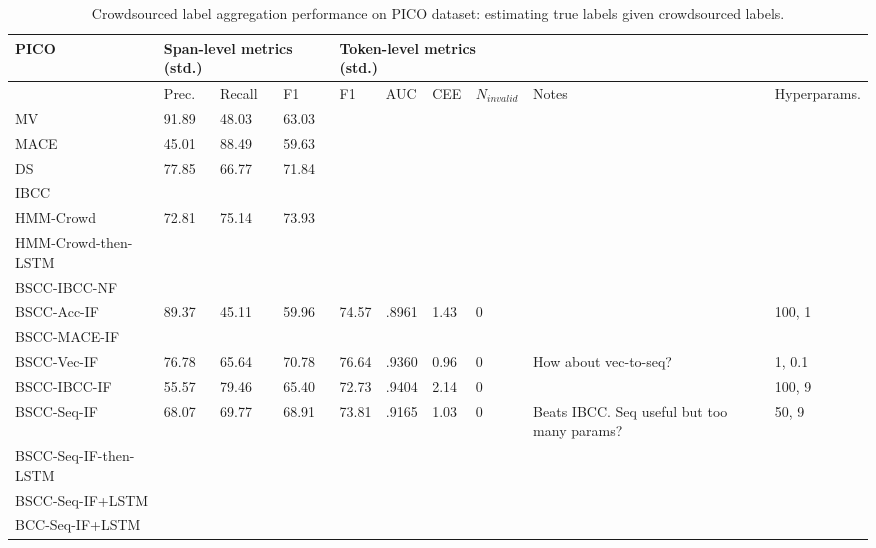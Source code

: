\begin{table}
\begin{tabularx}{\textwidth}{| l | X | X | X | X | X | X | X | X | X |}
\hline
PICO & \multicolumn{3}{|l|}{Span-level metrics (std.)}                          & \multicolumn{4}{|l|}{Token-level metrics (std.)} & &\\ \hline 
& Prec. & Recall & F1 & F1 & AUC & CEE & $N_{invalid}$ & Notes & Hyperparams. \\ \hline
MV & 91.89 & 48.03 & 63.03 & \\
MACE & 45.01 & 88.49 & 59.63 &\\
DS & 77.85 & 66.77 & 71.84 &\\ 
IBCC & \\ \hline
HMM-Crowd & 72.81 & 75.14 & 73.93 &\\ 
HMM-Crowd-then-LSTM &\\ \hline
BSCC-IBCC-NF & \\ \hline
BSCC-Acc-IF & 89.37 & 45.11 & 59.96 & 74.57 & .8961 & 1.43 & 0 & & 100, 1 \\
BSCC-MACE-IF & \\
BSCC-Vec-IF & 76.78 & 65.64 & 70.78 & 76.64 & .9360 & 0.96 & 0 & How about vec-to-seq? & 1, 0.1\\
BSCC-IBCC-IF & 55.57 & 79.46 & 65.40 & 72.73 & .9404 & 2.14 & 0 & & 100, 9 \\
BSCC-Seq-IF & 68.07 & 69.77 & 68.91 & 73.81 & .9165 & 1.03 & 0 & Beats IBCC. Seq useful but too many params? & 50, 9 \\ \hline
BSCC-Seq-IF-then-LSTM &\\
BSCC-Seq-IF+LSTM &\\
BCC-Seq-IF+LSTM &\\ %
\hline
\end{tabularx}
\caption{Crowdsourced label aggregation performance on PICO dataset: estimating true labels given crowdsourced labels.}
\label{tab:aggregation_results_pico}
\end{table}

